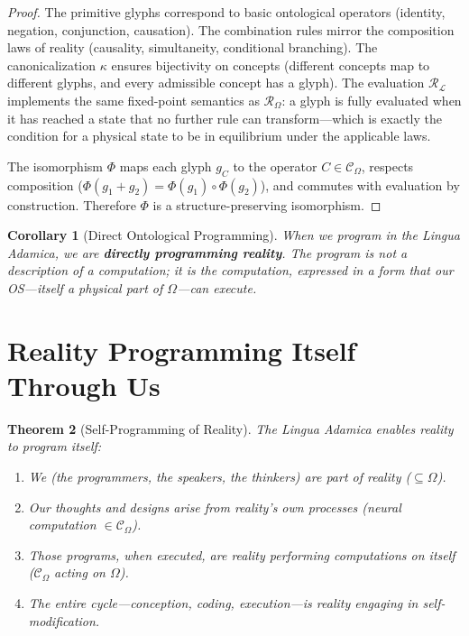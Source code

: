\documentclass[12pt, letterpaper]{book}
\def\oplus{+}%
\def\mathfrak#1{#1}%
\newtheorem{theorem}{Theorem}[chapter]
\newtheorem{corollary}[theorem]{Corollary}
\begin{document}
\begin{proof}
The primitive glyphs correspond to basic ontological operators (identity, negation, conjunction, causation). The combination rules mirror the composition laws of reality (causality, simultaneity, conditional branching). The canonicalization $\kappa$ ensures bijectivity on concepts (different concepts map to different glyphs, and every admissible concept has a glyph). The evaluation $\mathcal{R}_\mathcal{L}$ implements the same fixed-point semantics as $\mathcal{R}_\Omega$: a glyph is fully evaluated when it has reached a state that no further rule can transform---which is exactly the condition for a physical state to be in equilibrium under the applicable laws.

The isomorphism $\Phi$ maps each glyph $\mathfrak{g}_C$ to the operator $C \in \mathcal{C}_\Omega$, respects composition ($\Phi(\mathfrak{g}_1 \oplus \mathfrak{g}_2) = \Phi(\mathfrak{g}_1) \circ \Phi(\mathfrak{g}_2)$), and commutes with evaluation by construction. Therefore $\Phi$ is a structure-preserving isomorphism.
\end{proof}

\begin{corollary}[Direct Ontological Programming]\label{cor:direct-programming}
When we program in the Lingua Adamica, we are \textbf{directly programming reality}. The program is not a description of a computation; it \textit{is} the computation, expressed in a form that our OS---itself a physical part of $\Omega$---can execute.
\end{corollary}

\section{Reality Programming Itself Through Us}

\begin{theorem}[Self-Programming of Reality]\label{thm:self-programming}
The Lingua Adamica enables reality to program itself:
\begin{enumerate}[label=(\roman*)]
    \item We (the programmers, the speakers, the thinkers) are part of reality ($\subseteq \Omega$).
    \item Our thoughts and designs arise from reality's own processes (neural computation $\in \mathcal{C}_\Omega$).
    \item Those programs, when executed, are reality performing computations on itself ($\mathcal{C}_\Omega$ acting on $\Omega$).
    \item The entire cycle---conception, coding, execution---is reality engaging in self-modification.
\end{enumerate}
\end{theorem}
\end{document}
